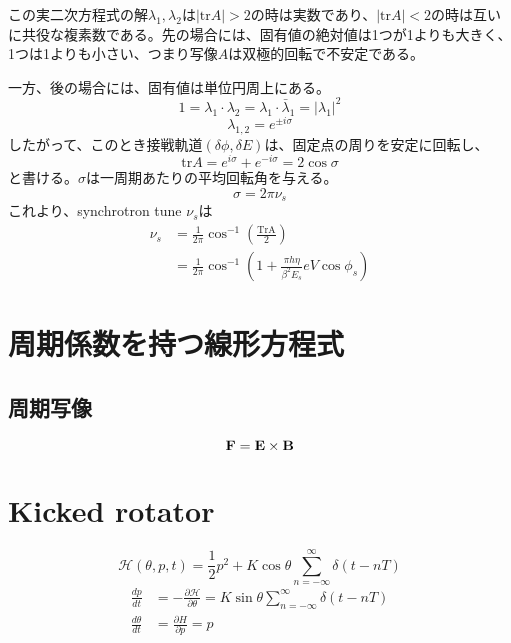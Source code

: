 \documentclass[]{jlreq}
\begin{document}
この実二次方程式の解$\lambda_1, \lambda_2$は$|\mathrm{tr}A| > 2$の時は実数であり、$|\mathrm{tr}A| < 2$の時は互いに共役な複素数である。先の場合には、固有値の絶対値は1つが1よりも大きく、1つは1よりも小さい、つまり写像$A$は双極的回転で不安定である。

一方、後の場合には、固有値は単位円周上にある。
%
\begin{equation}
    1 = \lambda_1 \cdot \lambda_2 = \lambda_1 \cdot \bar{\lambda}_1 = |\lambda_1|^2
\end{equation}
%
\begin{equation}
    \lambda_{1,2} = e^{\pm i \sigma}
\end{equation}
%
したがって、このとき接戦軌道$(\delta\phi, \delta E)$は、固定点の周りを安定に回転し、
%
\begin{equation}
    \mathrm{tr} A = e^{ i \sigma} + e^{- i \sigma} = 2 \cos\sigma
\end{equation}
%
と書ける。$\sigma$は一周期あたりの平均回転角を与える。
%
\begin{equation}
    \sigma = 2 \pi \nu_s
\end{equation}
%
これより、synchrotron tune $\nu_s$は
%
\begin{align}
    \nu_s &= \frac{1}{2\pi} \cos^{-1}\left(\frac{\mathrm{Tr A}}{2}\right) \\
        &= \frac{1}{2\pi} \cos^{-1}\left(1+\frac{\pi h \eta}{\beta^2 E_s} e V \cos\phi_s\right)
\end{align}
%
\section{周期係数を持つ線形方程式}
\subsection{周期写像}
\begin{equation}
    \vb{F} = \vb{E} \times \vb{B}
\end{equation}

\section{Kicked rotator}
%
\begin{equation}
    \mathcal{H}(\theta, p, t) = \frac{1}{2}p^2 + K \cos\theta \sum_{n=-\infty}^{\infty}\delta(t - n T)
\end{equation}
%
\begin{align}
    \frac{dp}{dt} &= -\frac{\partial \mathcal{H}}{\partial \theta} = K \sin\theta \sum_{n=-\infty}^{\infty}\delta(t - n T)\\
    \frac{d\theta}{dt} &= \frac{\partial H}{\partial p} = p
\end{align}
%
\end{document}
